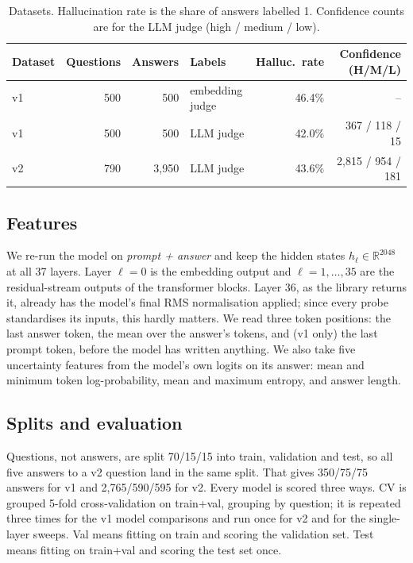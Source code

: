 \documentclass[11pt]{article}
\begin{document}
\begin{table}[t]
  \centering\small
  \caption{Datasets. Hallucination rate is the share of answers labelled 1. Confidence counts are for the LLM judge (high / medium / low).}
  \label{tab:data}
  \begin{tabular}{lrrlrr}
    \toprule
    Dataset & Questions & Answers & Labels & Halluc.\ rate & Confidence (H/M/L) \\
    \midrule
    v1 & 500 & 500 & embedding judge & 46.4\% & -- \\
    v1 & 500 & 500 & LLM judge & 42.0\% & 367 / 118 / 15 \\
    v2 & 790 & 3,950 & LLM judge & 43.6\% & 2,815 / 954 / 181 \\
    \bottomrule
  \end{tabular}
\end{table}

\subsection{Features}
We re-run the model on \emph{prompt + answer} and keep the hidden states $h_\ell \in \mathbb{R}^{2048}$ at all 37 layers. Layer $\ell=0$ is the embedding output and $\ell=1,\dots,35$ are the residual-stream outputs of the transformer blocks. Layer 36, as the library returns it, already has the model's final RMS normalisation applied; since every probe standardises its inputs, this hardly matters. We read three token positions: the last answer token, the mean over the answer's tokens, and (v1 only) the last prompt token, before the model has written anything. We also take five uncertainty features from the model's own logits on its answer: mean and minimum token log-probability, mean and maximum entropy, and answer length.

\subsection{Splits and evaluation}
Questions, not answers, are split 70/15/15 into train, validation and test, so all five answers to a v2 question land in the same split. That gives 350/75/75 answers for v1 and 2,765/590/595 for v2. Every model is scored three ways. CV is grouped 5-fold cross-validation on train+val, grouping by question; it is repeated three times for the v1 model comparisons and run once for v2 and for the single-layer sweeps. Val means fitting on train and scoring the validation set. Test means fitting on train+val and scoring the test set once.
\end{document}
